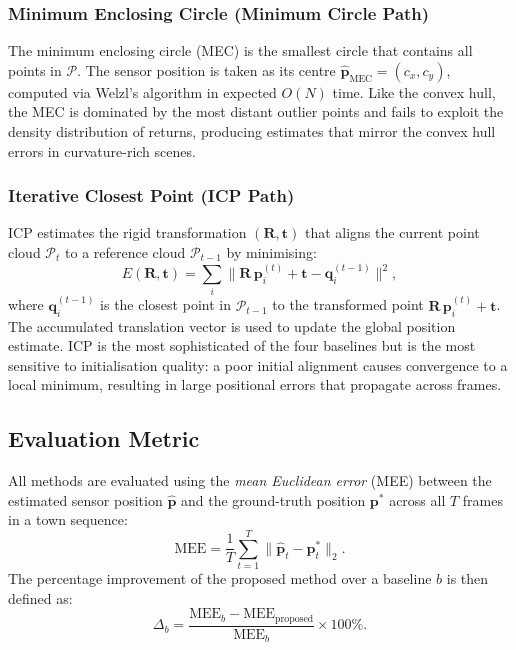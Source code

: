 \documentclass[lettersize,journal]{IEEEtran}
\begin{document}
\subsubsection{Minimum Enclosing Circle (Minimum Circle Path)}

The minimum enclosing circle (MEC) is the smallest circle that contains all
points in $\mathcal{P}$. The sensor position is taken as its centre
$\hat{\mathbf{p}}_{\text{MEC}} = (c_x, c_y)$, computed via Welzl's
algorithm in expected $O(N)$ time. Like the convex hull, the MEC is
dominated by the most distant outlier points and fails to exploit the
density distribution of returns, producing estimates that mirror the
convex hull errors in curvature-rich scenes.

\subsubsection{Iterative Closest Point (ICP Path)}

ICP \cite{besl1992method} estimates the rigid transformation
$(\mathbf{R}, \mathbf{t})$ that aligns the current point cloud
$\mathcal{P}_t$ to a reference cloud $\mathcal{P}_{t-1}$ by minimising:
\begin{equation}
  E(\mathbf{R}, \mathbf{t}) =
  \sum_{i} \bigl\| \mathbf{R}\,\mathbf{p}_i^{(t)} + \mathbf{t}
  - \mathbf{q}_i^{(t-1)} \bigr\|^2,
  \label{eq:icp}
\end{equation}
where $\mathbf{q}_i^{(t-1)}$ is the closest point in $\mathcal{P}_{t-1}$ to the
transformed point $\mathbf{R}\,\mathbf{p}_i^{(t)} + \mathbf{t}$. The accumulated
translation vector is used to update the global position estimate. ICP is the most
sophisticated of the four baselines but is the most sensitive to initialisation
quality: a poor initial alignment causes convergence to a local minimum, resulting
in large positional errors that propagate across frames.

\subsection{Evaluation Metric}

All methods are evaluated using the \textit{mean Euclidean error} (MEE) between
the estimated sensor position $\hat{\mathbf{p}}$ and the ground-truth position
$\mathbf{p}^*$ across all $T$ frames in a town sequence:
\begin{equation}
  \text{MEE} = \frac{1}{T} \sum_{t=1}^{T}
  \bigl\| \hat{\mathbf{p}}_t - \mathbf{p}^*_t \bigr\|_2.
  \label{eq:mee}
\end{equation}
The percentage improvement of the proposed method over a baseline $b$ is then
defined as:
\begin{equation}
  \Delta_b = \frac{\text{MEE}_b - \text{MEE}_{\text{proposed}}}
                  {\text{MEE}_b} \times 100\%.
  \label{eq:improvement}
\end{equation}
\end{document}
